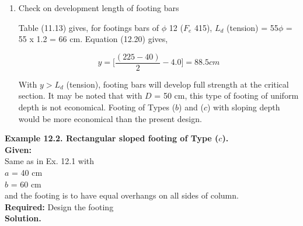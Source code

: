 \documentclass{book}
\begin{document}
\begin{enumerate}
        \item Check on development length of footing bars

Table (11.13) gives, for footings bars of $\phi$ 12 ($F_e$ 415),
$L_d$ (tension) = 55$\phi$ = 55 x 1.2 = 66 cm.
Equation (12.20) gives, 

$$y=\bigg[\frac{(225-40)}{2}-4.0\bigg]=88.5cm$$

With $y > L_d$ (tension), footing bars will develop full strength at the critical section. It may be noted that with $D$ = 50 cm, this type of footing of uniform depth is not economical. Footing of Types ($b$) and ($c$) with sloping depth would be more economical than the present design.\\
\end{enumerate} 

\textbf{ Example 12.2. Rectangular sloped footing of Type ($c$).}\\
\textbf{Given:}\\
Same as in Ex. 12.1 with\\
$a$ = 40 cm\\
$b$ = 60 cm\\ 
and the footing is to have equal overhangs on all sides of column.\\
\textbf{Required:} Design the footing\\
\textbf{Solution.}
\end{document}
